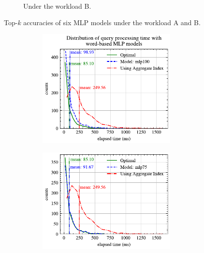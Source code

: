 \documentclass[conference]{IEEEtran}
\begin{document}
\begin{figure}[!th]
\begin{subfigure}{0.45\textwidth}
		\caption{Under the workload B.}
		\label{fig:top_k_mlp_B}
	\end{subfigure}
	\caption{Top-$k$ accuracies of six MLP models under the workload A and B.}
	\label{fig:top_k_mlp_all}
\end{figure}
\begin{figure}[!th]
	\centering
	\begin{subfigure}{0.45\textwidth}
		\begin{subfigure}{\textwidth}
			\centering
%			
			\includegraphics[]{graphics/perf_dist_mlp100_A.pdf}
		\end{subfigure}
		\vfill
		\begin{subfigure}{\textwidth}
			\centering
%			
			\includegraphics[]{graphics/perf_dist_mlp75_A.pdf}

\end{subfigure}
\end{subfigure}
\end{figure}
\end{document}

